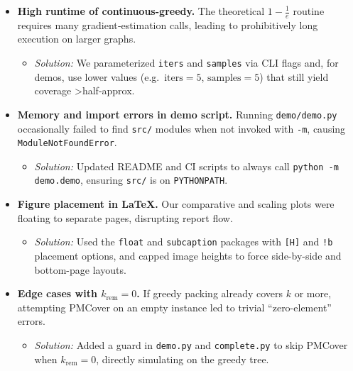 \documentclass[12pt]{article}
\begin{document}
\begin{itemize}
  \item \textbf{High runtime of continuous-greedy.}  
    The theoretical \(1-\tfrac1e\) routine requires many gradient‐estimation
    calls, leading to prohibitively long execution on larger graphs.
    \begin{itemize}
      \item \emph{Solution:} We parameterized \texttt{iters} and \texttt{samples} via CLI flags and, for demos, use lower values (e.g.\ \(\text{iters}=5\), \(\text{samples}=5\)) that still yield coverage \textgreater half‐approx.
    \end{itemize}

  \item \textbf{Memory and import errors in demo script.}  
    Running \texttt{demo/demo.py} occasionally failed to find \texttt{src/}
    modules when not invoked with \texttt{-m}, causing \texttt{ModuleNotFoundError}.
    \begin{itemize}
      \item \emph{Solution:} Updated README and CI scripts to always call
        \texttt{python -m demo.demo}, ensuring \texttt{src/} is on \texttt{PYTHONPATH}.
    \end{itemize}

  \item \textbf{Figure placement in LaTeX.}  
    Our comparative and scaling plots were floating to separate pages,
    disrupting report flow.
    \begin{itemize}
      \item \emph{Solution:} Used the \texttt{float} and \texttt{subcaption}
        packages with \texttt{[H]} and \texttt{!b} placement options, and
        capped image heights to force side-by-side and bottom-page layouts.
    \end{itemize}

  \item \textbf{Edge cases with \(k_{\mathrm{rem}}=0\).}  
    If greedy packing already covers \(k\) or more, attempting PMCover
    on an empty instance led to trivial “zero-element” errors.
    \begin{itemize}
      \item \emph{Solution:} Added a guard in \texttt{demo.py} and
        \texttt{complete.py} to skip PMCover when \(k_{\mathrm{rem}}=0\),
        directly simulating on the greedy tree.
    \end{itemize}
\end{itemize}
\end{document}
